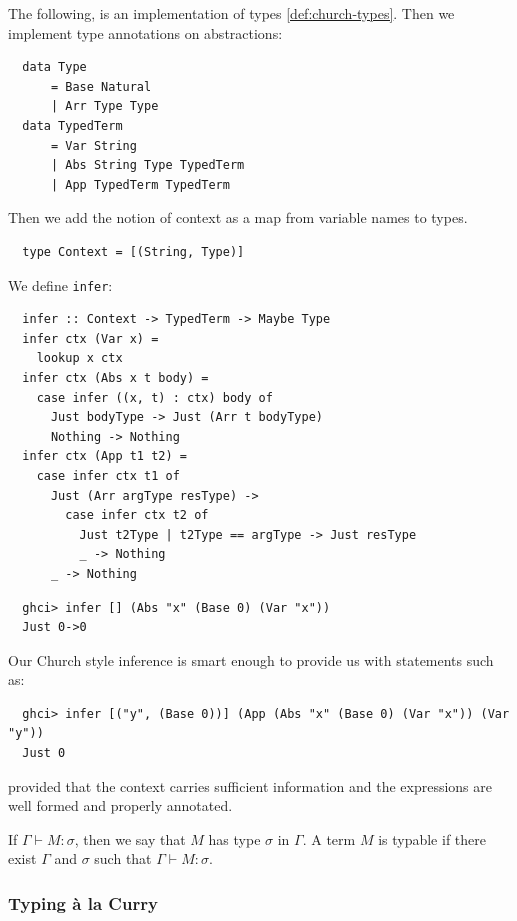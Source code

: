 \begin{example} The following, is an implementation of types   \ref{def:church-types}. Then we implement type annotations on abstractions:
\begin{verbatim}
  data Type
      = Base Natural
      | Arr Type Type
  data TypedTerm
      = Var String
      | Abs String Type TypedTerm
      | App TypedTerm TypedTerm
\end{verbatim}
Then we add the notion of context as a map from variable names to types.
\begin{verbatim}
  type Context = [(String, Type)]
\end{verbatim}
We define \texttt{infer}:
\begin{verbatim}
  infer :: Context -> TypedTerm -> Maybe Type
  infer ctx (Var x) =
    lookup x ctx
  infer ctx (Abs x t body) =
    case infer ((x, t) : ctx) body of
      Just bodyType -> Just (Arr t bodyType)
      Nothing -> Nothing
  infer ctx (App t1 t2) =
    case infer ctx t1 of
      Just (Arr argType resType) ->
        case infer ctx t2 of
          Just t2Type | t2Type == argType -> Just resType
          _ -> Nothing
      _ -> Nothing
\end{verbatim}

\begin{verbatim}
  ghci> infer [] (Abs "x" (Base 0) (Var "x"))
  Just 0->0
\end{verbatim}
Our Church style inference is smart enough to provide us with statements such as:
\begin{verbatim}
  ghci> infer [("y", (Base 0))] (App (Abs "x" (Base 0) (Var "x")) (Var "y"))
  Just 0
\end{verbatim}
provided that the context carries sufficient information and the expressions are well formed and properly annotated.

\end{example}

\begin{definition}
If $\Gamma \vdash M : \sigma$, then we say that $M$ has type $\sigma$ in $\Gamma$. A term $M$ is typable if there exist $\Gamma$ and $\sigma$ such that $\Gamma \vdash M : \sigma$.
\end{definition}

\subsubsection{\centering Typing à la Curry}

